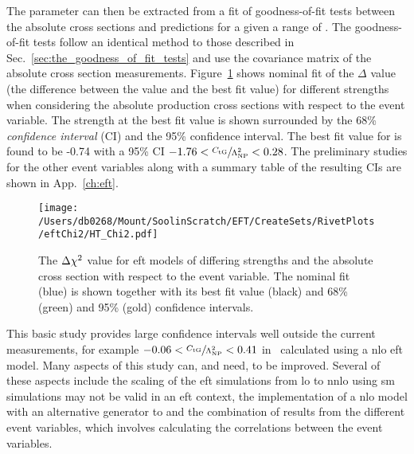 The \CTG{} parameter can then be extracted from a fit of \chisq{} goodness-of-fit tests between the absolute cross sections and predictions for a given a range of \CTG{}.
The goodness-of-fit tests follow an identical method to those described in Sec.~\ref{sec:the_goodness_of_fit_tests} and use the covariance matrix of the absolute cross section measurements.
Figure~\ref{fig:eftHT} shows nominal fit of the $\Delta$ \chisq{} value (the difference between the \chisq{} value and the best fit \chisq{} value) for different \CTG{} strengths when considering the absolute \ttbar{} production cross sections with respect to the \HT{} event variable.
The \CTG{} strength at the best fit \chisq{} value is shown surrounded by the 68\% \textit{confidence interval} (CI) and the 95\% confidence interval.
The best fit value for \CTG{} is found to be -0.74 with a 95\% CI $-1.76 < \sfrac{C_{\mathrm{tG}}}{\Lambda_{\mathrm{NP}}^{2}} < 0.28$.
The preliminary studies for the other event variables along with a summary table of the resulting CIs are shown in App.~\ref{ch:eft}.
\begin{figure}[htpb]
	\centering
	\texttt{[image: /Users/db0268/Mount/SoolinScratch/EFT/CreateSets/RivetPlots/eftChi2/HT\_Chi2.pdf]}
	\caption[The $\Delta \chisq{}$ value for \acrshort{eft} models of differing \CTG{} strengths and the absolute \ttbar{} cross section with respect to the \HT{} event variable. The nominal fit (blue) is shown together with its best fit value (black) and 68\% (green) and 95\% (gold) confidence intervals.]{The $\Delta \chisq{}$ value for \acrshort{eft} models of differing \CTG{} strengths and the absolute \ttbar{} cross section with respect to the \HT{} event variable. The nominal fit (blue) is shown together with its best fit value (black) and 68\% (green) and 95\% (gold) confidence intervals.}
	\label{fig:eftHT}
\end{figure}

This basic study provides large confidence intervals well outside the current measurements, for example $-0.06 < \sfrac{C_{\mathrm{tG}}}{\Lambda_{\mathrm{NP}}^{2}} < 0.41$ in~\cite{Future:TOP17014} calculated using a \acrshort{nlo} \acrshort{eft} model.
Many aspects of this study can, and need, to be improved.
Several of these aspects include the scaling of the \acrshort{eft} simulations from \acrshort{lo} to \acrshort{nnlo} using \acrshort{sm} simulations may not be valid in an \acrshort{eft} context, the implementation of a \acrshort{nlo} model with an alternative generator to \mgamcMLMpythia{} and the combination of results from the different event variables, which involves calculating the correlations between the event variables.  

